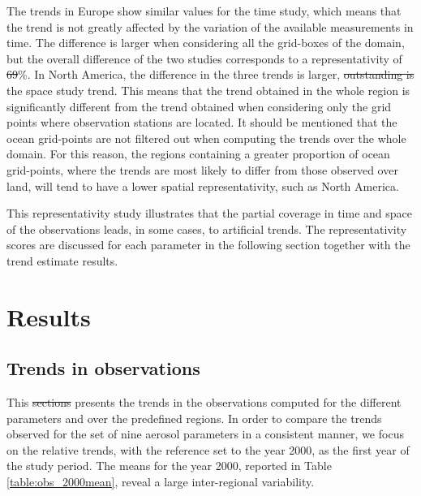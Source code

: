 \documentclass[acp, manuscript]{copernicus}
\providecommand{\DIFadd}[1]{{\protect\color{blue}\uwave{#1}}} %
\providecommand{\DIFdel}[1]{{\protect\color{red}\sout{#1}}}                      %
\providecommand{\DIFaddbegin}{} %
\providecommand{\DIFaddend}{} %
\providecommand{\DIFdelbegin}{} %
\providecommand{\DIFdelend}{} %
\begin{document}
The trends in Europe show similar values for the time study, which means that the trend is not greatly affected by the variation of the available measurements in time. The difference is larger when considering all the grid-boxes of the domain, but the overall difference of the two studies corresponds to a representativity of \DIFdelbegin \DIFdel{69}\DIFdelend \DIFaddbegin \DIFadd{76}\DIFaddend \%. In North America, the difference in the three trends is larger, \DIFdelbegin \DIFdel{outstanding is }\DIFdelend \DIFaddbegin \DIFadd{particularly for }\DIFaddend the space study trend. This means that the trend obtained in the whole region is significantly different from the trend obtained when considering only the grid points where observation stations are located. It should be mentioned that the ocean grid-points are not filtered out when computing the trends over the whole domain. For this reason, the regions containing a greater proportion of ocean grid-points, where the trends are most likely to differ from those observed over land, will tend to have a lower spatial representativity, such as North America.

This representativity study illustrates that the partial coverage in time and space of the observations leads, in some cases, to artificial trends. The representativity scores are discussed for each parameter in the following section together with the trend estimate results.

\section{Results}

\subsection{Trends in observations}\label{obs_trends}
This \DIFdelbegin \DIFdel{sections }\DIFdelend \DIFaddbegin \DIFadd{section }\DIFaddend presents the trends in the observations computed for the different parameters and over the predefined regions. In order to compare the trends observed for the set of nine aerosol parameters in a consistent manner, we focus on the relative trends, with the reference set to the year 2000, as the first year of the study period. The means for the year 2000, reported in Table \ref{table:obs_2000mean}, reveal a large inter-regional variability.
\end{document}

